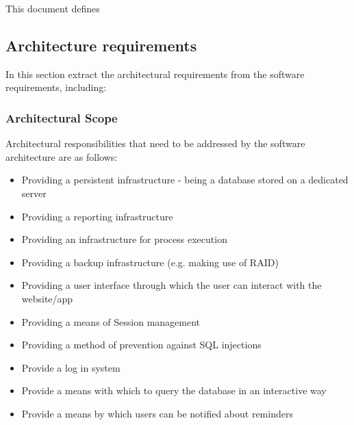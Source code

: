\documentclass[a4paper]{article}
\begin{document}
    This document defines 
    
    \subsection{Architecture requirements}
        In this section extract the architectural requirements from the software requirements, including:

    \subsubsection{Architectural Scope}
        Architectural responsibilities that need to be addressed by the software architecture are as follows:
        \begin{itemize}
            \item Providing a persistent infrastructure - being a database stored on a dedicated server
            \item Providing a reporting infrastructure
            \item Providing an infrastructure for process execution
            \item Providing a backup infrastructure (e.g. making use of RAID)
            \item Providing a user interface through which the user can interact with the website/app
            \item Providing a means of Session management
            \item Providing a method of prevention against SQL injections
            \item Provide a log in system
            \item Provide a means with which to query the database in an interactive way
            \item Provide a means by which users can be notified about reminders
        \end{itemize}
\end{document}
